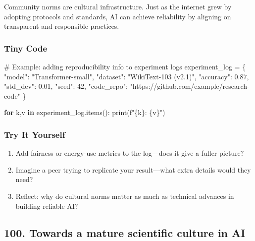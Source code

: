 \documentclass[
  letterpaper,
  DIV=11,
  numbers=noendperiod]{scrreprt}
\newenvironment{Shaded}{\begin{snugshade}}{\end{snugshade}}
\newcommand{\BuiltInTok}[1]{\textcolor[rgb]{0.00,0.23,0.31}{#1}}
\newcommand{\CommentTok}[1]{\textcolor[rgb]{0.37,0.37,0.37}{#1}}
\newcommand{\ControlFlowTok}[1]{\textcolor[rgb]{0.00,0.23,0.31}{\textbf{#1}}}
\newcommand{\DecValTok}[1]{\textcolor[rgb]{0.68,0.00,0.00}{#1}}
\newcommand{\FloatTok}[1]{\textcolor[rgb]{0.68,0.00,0.00}{#1}}
\newcommand{\KeywordTok}[1]{\textcolor[rgb]{0.00,0.23,0.31}{\textbf{#1}}}
\newcommand{\NormalTok}[1]{\textcolor[rgb]{0.00,0.23,0.31}{#1}}
\newcommand{\OperatorTok}[1]{\textcolor[rgb]{0.37,0.37,0.37}{#1}}
\newcommand{\SpecialCharTok}[1]{\textcolor[rgb]{0.37,0.37,0.37}{#1}}
\newcommand{\SpecialStringTok}[1]{\textcolor[rgb]{0.13,0.47,0.30}{#1}}
\newcommand{\StringTok}[1]{\textcolor[rgb]{0.13,0.47,0.30}{#1}}
\providecommand{\tightlist}{%
  \setlength{\itemsep}{0pt}\setlength{\parskip}{0pt}}
\begin{document}
Community norms are cultural infrastructure. Just as the internet grew
by adopting protocols and standards, AI can achieve reliability by
aligning on transparent and responsible practices.

\subsubsection{Tiny Code}\label{tiny-code-98}

\begin{Shaded}
\begin{Highlighting}[]
\CommentTok{\# Example: adding reproducibility info to experiment logs}
\NormalTok{experiment\_log }\OperatorTok{=}\NormalTok{ \{}
    \StringTok{"model"}\NormalTok{: }\StringTok{"Transformer{-}small"}\NormalTok{,}
    \StringTok{"dataset"}\NormalTok{: }\StringTok{"WikiText{-}103 (v2.1)"}\NormalTok{,}
    \StringTok{"accuracy"}\NormalTok{: }\FloatTok{0.87}\NormalTok{,}
    \StringTok{"std\_dev"}\NormalTok{: }\FloatTok{0.01}\NormalTok{,}
    \StringTok{"seed"}\NormalTok{: }\DecValTok{42}\NormalTok{,}
    \StringTok{"code\_repo"}\NormalTok{: }\StringTok{"https://github.com/example/research{-}code"}
\NormalTok{\}}

\ControlFlowTok{for}\NormalTok{ k,v }\KeywordTok{in}\NormalTok{ experiment\_log.items():}
    \BuiltInTok{print}\NormalTok{(}\SpecialStringTok{f"}\SpecialCharTok{\{}\NormalTok{k}\SpecialCharTok{\}}\SpecialStringTok{: }\SpecialCharTok{\{}\NormalTok{v}\SpecialCharTok{\}}\SpecialStringTok{"}\NormalTok{)}
\end{Highlighting}
\end{Shaded}

\subsubsection{Try It Yourself}\label{try-it-yourself-98}

\begin{enumerate}
\def\labelenumi{\arabic{enumi}.}
\tightlist
\item
  Add fairness or energy-use metrics to the log---does it give a fuller
  picture?
\item
  Imagine a peer trying to replicate your result---what extra details
  would they need?
\item
  Reflect: why do cultural norms matter as much as technical advances in
  building reliable AI?
\end{enumerate}

\subsection{100. Towards a mature scientific culture in
AI}\label{towards-a-mature-scientific-culture-in-ai}
\end{document}
